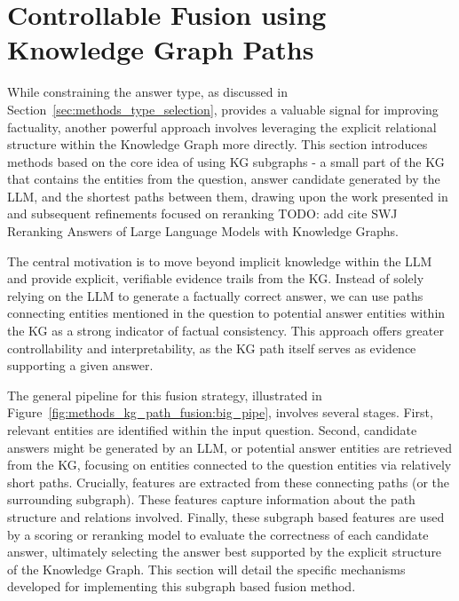 
\section{Controllable Fusion using Knowledge Graph Paths}
\label{sec:methods_kg_path_fusion}

While constraining the answer type, as discussed in Section~\ref{sec:methods_type_selection}, provides a valuable signal for improving factuality, another powerful approach involves leveraging the explicit relational structure within the Knowledge Graph more directly. This section introduces methods based on the core idea of using KG subgraphs - a small part of the KG that contains the entities from the question, answer candidate generated by the LLM, and the shortest paths between them, drawing upon the work presented in \cite{DBLP:journals/corr/abs-2310-02166} and subsequent refinements focused on reranking 
{\color{red} TODO: add cite SWJ Reranking Answers of Large Language Models with Knowledge Graphs}.

The central motivation is to move beyond implicit knowledge within the LLM and provide explicit, verifiable evidence trails from the KG. Instead of solely relying on the LLM to generate a factually correct answer, we can use paths connecting entities mentioned in the question to potential answer entities within the KG as a strong indicator of factual consistency. This approach offers greater controllability and interpretability, as the KG path itself serves as evidence supporting a given answer.

The general pipeline for this fusion strategy, illustrated in Figure~\ref{fig:methods_kg_path_fusion:big_pipe}, involves several stages. First, relevant entities are identified within the input question. Second, candidate answers might be generated by an LLM, or potential answer entities are retrieved from the KG, focusing on entities connected to the question entities via relatively short paths. Crucially, features are extracted from these connecting paths (or the surrounding subgraph). These features capture information about the path structure and relations involved. Finally, these subgraph based features are used by a scoring or reranking model to evaluate the correctness of each candidate answer, ultimately selecting the answer best supported by the explicit structure of the Knowledge Graph. This section will detail the specific mechanisms developed for implementing this subgraph based fusion method.

